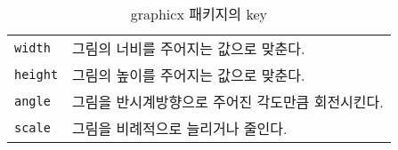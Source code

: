 

\begin{table}[!tb]
\caption{\textsf{graphicx} 패키지의 key}
\label{keyvals}
\begin{lined}{9.5cm}
\begin{tabular}{@{}ll}
\texttt{width}& 그림의 너비를 주어지는 값으로 맞춘다. \\
\texttt{height}& 그림의 높이를 주어지는 값으로 맞춘다. \\
\texttt{angle}& 그림을 반시계방향으로 주어진 각도만큼 회전시킨다.\\
\texttt{scale}& 그림을 비례적으로 늘리거나 줄인다.\\[-1ex]
\end{tabular}

\bigskip
\end{lined}
\end{table}

